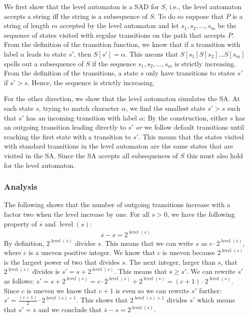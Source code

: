 \documentclass[a4paper,11pt]{article}
\DeclareMathOperator{\level}{level}
\begin{document}
We first show that the level automaton is a SAD for $S$, i.e., the level automaton accepts a string iff the string is a subsequence of $S$. To do so suppose that $P$ is a string of length $m$ accepted by the level automaton and let $s_1,s_2, \ldots , s_m$ be the sequence of states visited with regular transitions on the path that accepts $P$. From the definition of the transition function, we know that if a transition with label $\alpha$ leads to state $s'$, then $S[s']=\alpha$. This means that $S[s_1]S[s_2]\ldots S[s_m]$ spells out a subsequence of $S$ if the sequence $s_1, s_2, \ldots, s_m$ is strictly increasing. From the definition of the transitions, a state $s$ only have transitions to states $s'$ if $s'> s$. Hence, the sequence is strictly increasing.

For the other direction, we show that the level automaton simulates the SA. At each state $s$, trying to match character $\alpha$, we find the smallest state $s'>s$ such that $s'$ has an incoming transition with label $\alpha$: By the construction, either $s$ has an outgoing transition leading directly to $s'$ \emph{or} we follow default transitions until reaching the first state with a transition to $s'$. This means that the states visited with standard transitions in the level automaton are the same states that are visited in the SA. Since the SA accepts all subsequences of $S$ this must also hold for the level automaton.












\subsubsection{Analysis}
The following shows that the number of outgoing transitions increase with a factor two when the level increase by one.
For all $s>0$, we have the following property of $\overline{s}$ and $\level(s)$:
\begin{gather}
\overline{s} - s = 2^{\level(s)}\label{sec:overlinesminuss}
\end{gather}
By definition, $2^{\level(s)}$ divides $s$. This means that we can write $s$ as  $c\cdot 2^{\level(s)}$, where $c$ is a uneven positive integer. We know that $c$ is uneven because $2^{\level(s)}$ is the largest power of two that divides $s$. The next integer, larger than $s$, that $2^{\level(s)}$ divides is $s'= s + 2^{\level(s)}$. This means that $\overline{s}\geq s'$. We can rewrite $s'$ as follows: $s'= s + 2^{\level(s)}=c\cdot 2^{\level(s)} + 2^{\level(s)}=(c+1)\cdot 2^{\level(s)}$. Since $c$ is uneven we know that $c+1$ is even so we can rewrite $s'$ further: $s'=\frac{(c+1)}{2}\cdot 2^{\level(s)+1}$. This shows that $2^{\level(s)+1}$ divides $s'$ which means that $s'=\overline{s}$ and we conclude that $\overline{s} - s = 2^{\level(s)}$.
\end{document}
